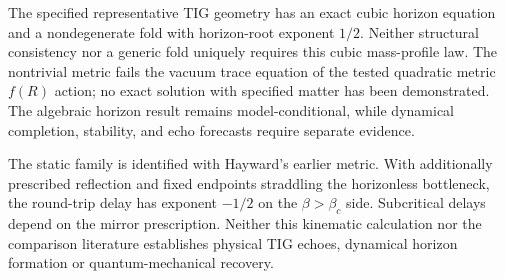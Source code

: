 \documentclass[11pt,final]{article}
\begin{document}
The specified representative TIG geometry has an exact cubic horizon equation
and a nondegenerate fold with horizon-root exponent $1/2$. Neither structural
consistency nor a generic fold uniquely requires this cubic mass-profile law.
The nontrivial metric fails the vacuum trace equation of the tested quadratic
metric $f(R)$ action; no exact solution with specified matter has been
demonstrated. The algebraic horizon result remains model-conditional, while
dynamical completion, stability, and echo forecasts require separate evidence.


The static family is identified with Hayward's earlier metric. With additionally
prescribed reflection and fixed endpoints straddling the horizonless bottleneck,
the round-trip delay has exponent $-1/2$ on the $\beta>\beta_c$ side.
Subcritical delays depend on the mirror prescription. Neither this kinematic
calculation nor the comparison literature establishes physical TIG echoes,
dynamical horizon formation or quantum-mechanical recovery.

\begingroup
\small
\setlength{\bibsep}{4pt}


\endgroup
\end{document}
